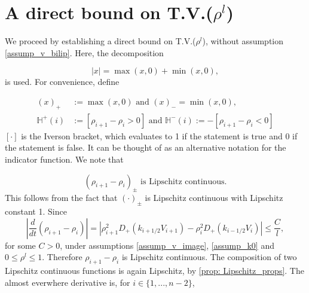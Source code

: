 \fi

\section{A direct bound on T.V.($\rho^l$)} \label{section:tv_rho}
We proceed by establishing a direct bound on T.V.($\rho^l$), without assumption \eqref{assump_v_bilip}. Here, the decomposition 

\begin{equation}
\left| x \right| = \max(x,0) + \min(x,0),
\end{equation}
is used. For convenience, define 

\begin{align}
	(x)_+ &:= \max(x,0) \text{ and } (x)_{-} = \min(x,0), \\
	\mathbb{H}^+(i) &:= [\rho_{i+1} - \rho_{i} > 0] \text{ and } \mathbb{H}^-(i) := - [\rho_{i+1} - \rho_{i} < 0] \label{Iverson}
\end{align}
$[\cdot]$ is the Iverson bracket, which evaluates to 1 if the statement is true and 0 if the statement is false. It can be thought of as an alternative notation for the indicator function. 
We note that  

\begin{equation} \label{diffrhomax_lipschitz}
	(\rho_{i+1} - \rho_i)_\pm \text{ is Lipschitz continuous}.
\end{equation}
This follows from the fact that $(\cdot)_\pm$ is Lipschitz continuous with Lipschitz constant 1. Since 
\begin{equation}
	\left|\frac{d}{dt} (\rho_{i+1} - \rho_i)\right|= \left| \rho_{i+1}^2D_+(k_{i+1/2}V_{i+1}) - \rho_{i}^2D_+(k_{i-1/2}V_i)\right| \leq \frac{C}{l}, 
\end{equation}
for some $C > 0$, under assumptions \eqref{assump_v_image}, \eqref{assump_k0}  and $0 \leq \rho^l \leq 1$. Therefore $\rho_{i+1} - \rho_i$ is Lipschitz continuous. The composition of two Lipschitz continuous functions is again Lipschitz, by \eqref{prop: Lipschitz_props}. %
The almost everwhere derivative is, for $i \in \{1,...,n-2\}$,


